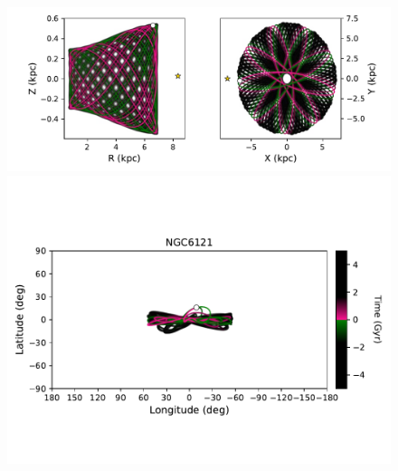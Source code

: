             \twocolumn
            \begin{figure}
                \begin{center}
                    \includegraphics[clip=true, trim = 0mm 2mm 0mm 0mm, width=\columnwidth]{images/PII_individual_NGC6121_NGC6121orbitRZXY.pdf}
                    \includegraphics[clip=true, trim = 0mm 20mm 0mm 10mm, width=\columnwidth]{images/PII_individual_NGC6121_NGC6121orbit.pdf}


\end{center}
\end{figure}
